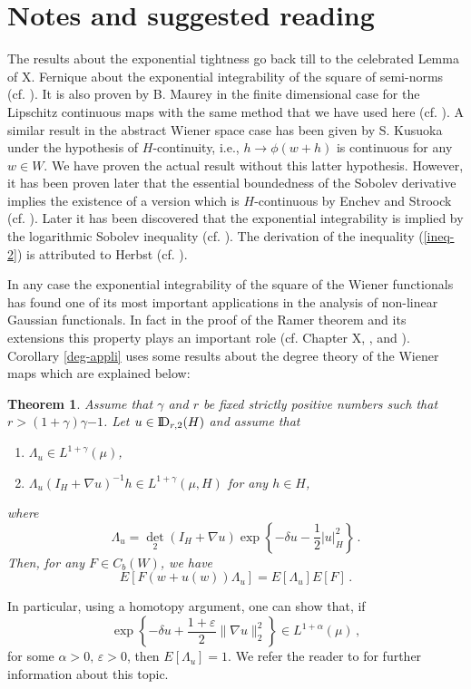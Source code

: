 \documentclass[12pt,a4paper]{book}
\newtheorem{theorem}{Theorem}[section]
\newcommand{\La}{\Lambda}
\newcommand{\eps}{\varepsilon}
\newcommand{\DD}{{\rm I\!D}}
\newcommand{\dett}{{\textstyle{\det_2}}}
\begin{document}
\section*{Notes and suggested reading}
{\footnotesize{The results about the exponential tightness go back
    till to the celebrated Lemma of X. Fernique about the
    exponential integrability of the square of semi-norms
    (cf. \cite{KUO}). It is also proven
    by B. Maurey in the finite dimensional case for the Lipschitz
    continuous maps with the same  method that we have used here
    (cf. \cite{P}). A similar
    result in the abstract Wiener space case has been given by
    S. Kusuoka under the hypothesis of $H$-continuity, i.e.,  $h\to
    \phi(w+h)$ is continuous for any $w\in W$. We have proven the actual result
    without this latter hypothesis. However, it has been proven later
    that the essential boundedness of the Sobolev derivative implies
    the existence of a version which is $H$-continuous by Enchev and
    Stroock (cf. \cite{E-S}). Later it has been discovered that the
    exponential integrability is implied by the logarithmic Sobolev
    inequality (cf. \cite{A-M-S}). The derivation of the inequality
    (\ref{ineq-2}) is attributed to Herbst (cf. \cite{Led}).



    In any case the exponential
    integrability of the square of the Wiener functionals has found
    one of its most important applications in the analysis of
    non-linear Gaussian functionals. In fact in the proof of the Ramer
    theorem and its extensions this property plays an important role
    (cf. Chapter X, \cite{UZ5}, \cite{UZ6}  and  \cite{UZ7}).
    Corollary \ref{deg-appli} uses some results about the degree
    theory of the Wiener maps which are explained below:
\begin{theorem}
\label{degree-thm}
   Assume that $\gamma$ and $r$ be fixed strictly positive numbers
   such that $r>(1+\gamma)\gamma{-1}$. Let $u\in\DD_{r,2}(H)$ and assume
   that
\begin{enumerate}
\item $\La_u\in L^{1+\gamma}(\mu)$,
\item $\La_u(I_H+\nabla u)^{-1}h\in L^{1+\gamma}(\mu,H)$ for any $h\in H$,
\end{enumerate}
where
$$
\La_u=\dett(I_H+\nabla u)\exp\left\{-\delta u-\frac{1}{2}|u|_H^2\right\}\,.
$$
Then, for any $F\in C_b(W)$, we have
$$
E\left[F(w+u(w))\La_u\right]=E[\La_u]E[F]\,.
$$
\end{theorem}
In particular, using a homotopy argument, one can show that, if
$$
\exp\left\{-\delta u+\frac{1+\eps}{2}\|\nabla u\|_2^2\right\}\in
L^{1+\alpha}(\mu)\,,
$$
for some $\alpha>0,\,\eps>0$, then $E[\La_u]=1$.
We refer the reader to \cite{UZ7} for further information about this topic.



}}
\end{document}

